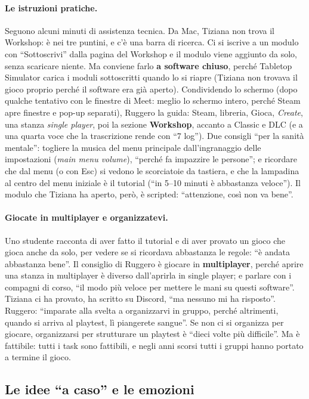 \paragraph{Le istruzioni pratiche.} Seguono alcuni minuti di assistenza tecnica.
Da Mac, Tiziana non trova il Workshop: è nei tre puntini, e c'è una barra di
ricerca. Ci si iscrive a un modulo con ``Sottoscrivi'' dalla pagina del Workshop e il
modulo viene aggiunto da solo, senza scaricare niente. Ma conviene farlo \textbf{a
software chiuso}, perché Tabletop Simulator carica i moduli sottoscritti quando lo si
riapre (Tiziana non trovava il gioco proprio perché il software era già
aperto). Condividendo lo schermo (dopo qualche tentativo con le finestre di Meet:
meglio lo schermo intero, perché Steam apre finestre e pop-up separati), Ruggero la
guida: Steam, libreria, Gioca, \emph{Create}, una stanza \emph{single player}, poi la
sezione \textbf{Workshop}, accanto a Classic e DLC (e a una quarta voce che la
trascrizione rende con ``7 log''). Due consigli ``per la sanità
mentale'': togliere la musica del menu principale dall'ingranaggio delle impostazioni
(\emph{main menu volume}), ``perché fa impazzire le persone''; e ricordare che dal menu
(o con Esc) si vedono le scorciatoie da tastiera, e che la lampadina al centro del menu
iniziale è il tutorial (``in 5--10 minuti è abbastanza veloce''). Il modulo che Tiziana ha
aperto, però, è scripted: ``attenzione, così non va bene''.

\paragraph{Giocate in multiplayer e organizzatevi.} Uno studente racconta di aver fatto
il tutorial e di aver provato un gioco che gioca anche da solo, per vedere se si
ricordava abbastanza le regole: ``è andata abbastanza bene''. Il consiglio di Ruggero
è giocare in \textbf{multiplayer}, perché aprire una stanza in multiplayer è diverso
dall'aprirla in single player; e parlare con i compagni di corso, ``il modo più veloce
per mettere le mani su questi software''. Tiziana ci ha provato, ha scritto su
Discord, ``ma nessuno mi ha risposto''. Ruggero: ``imparate alla svelta a organizzarvi
in gruppo, perché altrimenti, quando si arriva al playtest, lì piangerete sangue''. Se
non ci si organizza per giocare, organizzarsi per strutturare un playtest è ``dieci
volte più difficile''. Ma è fattibile: tutti i task sono fattibili, e negli anni scorsi
tutti i gruppi hanno portato a termine il gioco.

\subsection{Le idee ``a caso'' e le emozioni}
\label{a7:sec:tut-idee}

